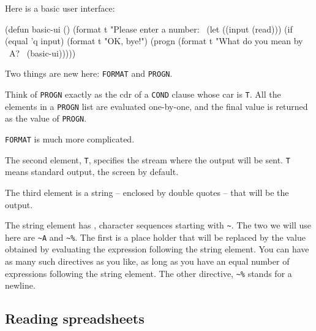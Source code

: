 \documentclass[a4paper,11pt]{article}
\begin{document}
\begin{uenum}
\item Here is a basic user interface:

\begin{lispcode}
(defun basic-ui ()
  (format t "Please enter a number:~%
  (let ((input (read)))
	(if (equal 'q input)
	  (format t "OK, bye!")
	  (progn 
		(format t "What do you mean by ~A?~%
		(basic-ui)))))
\end{lispcode}

\item Two things are new here: \Verb+FORMAT+ and \Verb+PROGN+. 
\item Think of \Verb+PROGN+ exactly as the cdr of a \Verb+COND+ clause whose car is \Verb+T+. All the elements in a \Verb+PROGN+ list are evaluated one-by-one, and the final value is returned as the value of \Verb+PROGN+.
\item \Verb+FORMAT+ is much more complicated.
\begin{uenumi}
\item The second element, \Verb+T+, specifies the stream where the output will be sent. \Verb+T+ means standard output, the screen by default.
\item The third element is a string -- enclosed by double quotes -- that will be the output.
\item The string element has , character sequences starting with \Verb+~+. The two we will use here are \Verb+~A+ and \Verb+~%
The first is a place holder that will be replaced by the value obtained by evaluating the expression following the string element. You can have as many such directives as you like, as long as you have an equal number of expressions following the string element. The other directive, \Verb+~%
\end{uenumi}

\end{uenum}

\subsection{Reading spreadsheets}
\end{document}
